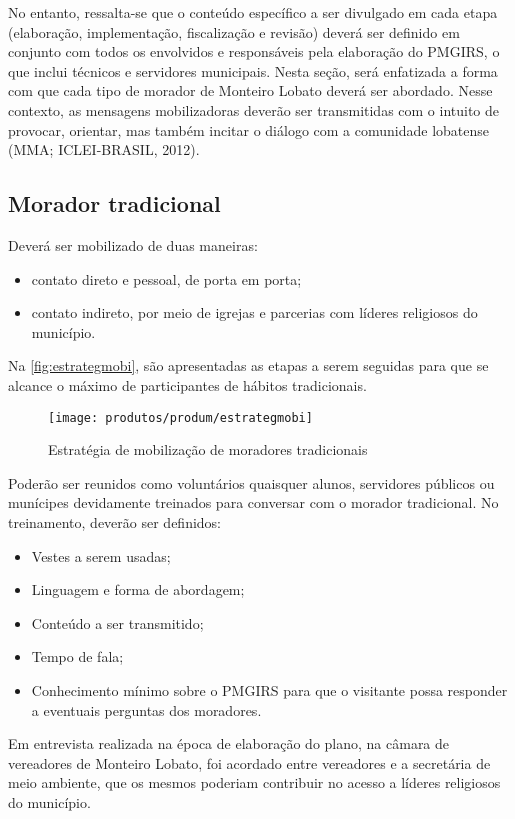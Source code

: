 No entanto, ressalta-se que o conteúdo específico a ser divulgado em cada etapa (elaboração, implementação, fiscalização e revisão) deverá ser definido em conjunto com todos os envolvidos e responsáveis pela elaboração do PMGIRS, o que inclui técnicos e servidores municipais. Nesta seção, será enfatizada a forma com que cada tipo de morador de Monteiro Lobato deverá ser abordado. Nesse contexto, as mensagens mobilizadoras deverão ser transmitidas com o intuito de provocar, orientar, mas também incitar o diálogo com a comunidade lobatense (MMA; ICLEI-BRASIL, 2012).

\subsection{Morador tradicional}

Deverá ser mobilizado de duas maneiras:
\begin{itemize}
	\item contato direto e pessoal, de porta em porta;
	\item contato indireto, por meio de igrejas e parcerias com líderes religiosos do município.
\end{itemize}

Na \autoref{fig:estrategmobi}, são apresentadas as etapas a serem seguidas para que se alcance o máximo de participantes de hábitos tradicionais.

\begin{figure}[h!]
	\centering
	\texttt{[image: produtos/produm/estrategmobi]}
	\caption{Estratégia de mobilização de moradores tradicionais}
	\label{fig:estrategmobi}
\end{figure}

Poderão ser reunidos como voluntários quaisquer alunos, servidores públicos ou munícipes devidamente treinados para conversar com o morador tradicional. No treinamento, deverão ser definidos:

\begin{itemize}
	\item Vestes a serem usadas;
	\item Linguagem e forma de abordagem;
	\item Conteúdo a ser transmitido;
	\item Tempo de fala;
	\item Conhecimento mínimo sobre o PMGIRS para que o visitante possa responder a eventuais
	perguntas dos moradores.
\end{itemize}

Em entrevista realizada na época de elaboração do plano, na câmara de vereadores de Monteiro Lobato, foi acordado entre vereadores e a secretária de meio ambiente, que os mesmos poderiam contribuir no acesso a líderes religiosos do município.

